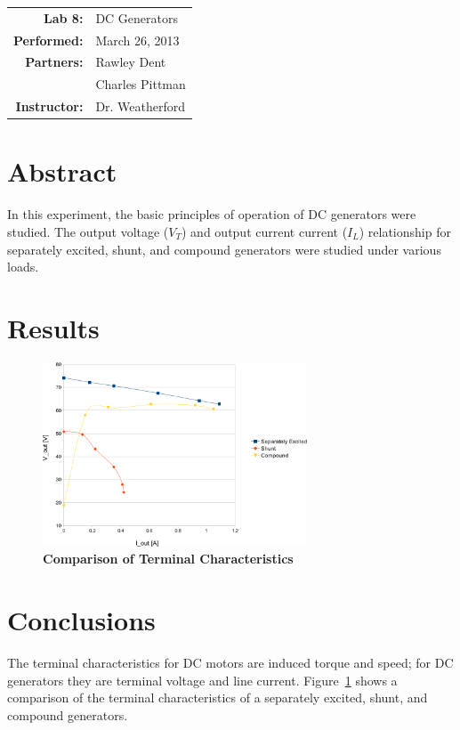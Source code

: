 \documentclass{article}
\begin{document}
\begin{tabular}{rl}
  \textbf{Lab 8:} & DC Generators \\
  \textbf{Performed:} & March 26, 2013 \\
  \textbf{Partners:} & Rawley Dent \\ & Charles Pittman \\
  \textbf{Instructor:} & Dr. Weatherford
\end{tabular}


\section*{Abstract}

In this experiment, the basic principles of operation of DC generators were
studied. The output voltage ($V_T$) and output current current ($I_L$)
relationship for separately excited, shunt, and compound generators were
studied under various loads.

\section*{Results}

\begin{figure}[H]
  \centering
    \includegraphics[width=0.7\textwidth]{img/graph}
    \caption{\textbf{Comparison of Terminal Characteristics}}
    \label{fig:graph}
\end{figure}

\section*{Conclusions}

The terminal characteristics for DC motors are induced torque and speed; for DC
generators they are terminal voltage and line current.  Figure~\ref{fig:graph}
shows a comparison of the terminal characteristics of a separately excited,
shunt, and compound generators.
\end{document}
